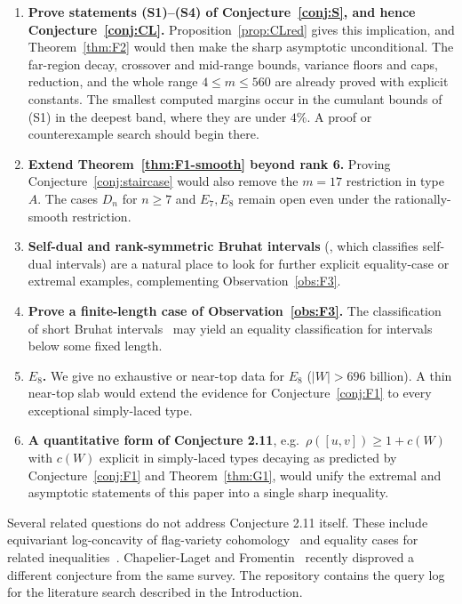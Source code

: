\documentclass[11pt]{amsart}
\theoremstyle{plain}
\theoremstyle{definition}
\theoremstyle{remark}
\newcommand{\W}{W}
\begin{document}
\begin{enumerate}
\item \textbf{Prove statements (S1)--(S4) of
Conjecture~\ref{conj:S}, and hence Conjecture~\ref{conj:CL}.}
Proposition~\ref{prop:CLred} gives this implication, and
Theorem~\ref{thm:F2} would then make the sharp asymptotic unconditional.
The far-region decay, crossover and mid-range bounds, variance floors and
caps, reduction, and the whole range $4\le m\le560$ are already proved
with explicit constants. The smallest computed margins occur in the
cumulant bounds of (S1) in the deepest band, where they are under $4\%$.
A proof or counterexample search should begin there.
\item \textbf{Extend Theorem~\ref{thm:F1-smooth} beyond rank 6.}
Proving Conjecture~\ref{conj:staircase} would also remove the $m=17$
restriction in type $A$. The cases $D_n$ for $n\ge7$ and $E_7,E_8$ remain
open even under the rationally-smooth restriction.
\item \textbf{Self-dual and rank-symmetric Bruhat intervals}
(\cite{gaetzgao2020}, which classifies self-dual intervals) are a natural
place to look for further explicit equality-case or extremal examples,
complementing Observation~\ref{obs:F3}.
\item \textbf{Prove a finite-length case of
Observation~\ref{obs:F3}.} The classification of short Bruhat
intervals~\cite{short-intervals} may yield an equality classification for
intervals below some fixed length.
\item \textbf{$E_8$.} We give no exhaustive or near-top data for $E_8$
($|W|>696$ billion). A thin near-top slab would extend the evidence for
Conjecture~\ref{conj:F1} to every exceptional simply-laced type.
\item \textbf{A quantitative form of Conjecture 2.11}, e.g.\ $\rho([u,v])
\ge 1+c(\W)$ with $c(\W)$ explicit in simply-laced types decaying as
predicted by Conjecture~\ref{conj:F1} and Theorem~\ref{thm:G1}, would unify
the extremal and asymptotic statements of this paper into a single sharp
inequality.
\end{enumerate}

Several related questions do not address Conjecture 2.11 itself. These
include equivariant log-concavity of flag-variety
cohomology~\cite{equivariant-logconcave} and equality cases for related
inequalities~\cite{stanley-yan,kahn-saks}. Chapelier-Laget and
Fromentin~\cite{chapelier-fromentin} recently disproved a different
conjecture from the same survey. The repository contains the query log for
the literature search described in the Introduction.
\end{document}
